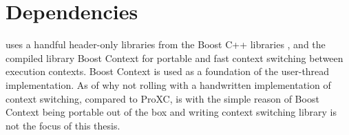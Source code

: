 \section{Dependencies}
\label{sec:dependencies}


\Proxc{} uses a handful header\hyp{}only libraries from the Boost C++ libraries \citep{boost2017boost}, and the compiled library Boost Context \citep{kowalke2017boost} for portable and fast context switching between execution contexts. Boost Context is used as a foundation of the user\hyp{}thread implementation. As of why not rolling with a handwritten implementation of context switching, compared to ProXC, is with the simple reason of Boost Context being portable out of the box and writing context switching library is not the focus of this thesis.

